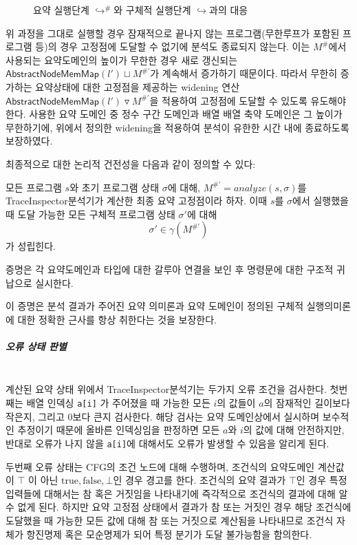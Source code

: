 \documentclass[a4paper,12pt]{article}
\newcommand{\imp}{\textsf{Imp}}
\newcommand{\traceinspector}{\textsf{TraceInspector}}
\begin{document}
\begin{figure}[t]
    \centering
    
    \caption{요약 실행단계 $\hookrightarrow^{\#}$와 구체적 실행단계 $\hookrightarrow$과의 대응}
    \label{fig:abs_conc_commute}
\end{figure}

위 과정을 그대로 실행할 경우 잠재적으로 끝나지 않는 프로그램(무한루프가 포함된 프로그램 등)의 경우 고정점에 도달할 수 없기에 분석도 종료되지 않는다. 
이는 $M^{\#}$에서 사용되는 요약도메인의 높이가 무한한 경우 새로 갱신되는 $\mathsf{AbstractNodeMemMap}(l') \sqcup M^{\#'}$가 계속해서 증가하기 때문이다. 따라서 무한히 증가하는 요약상태에 대한 고정점을 제공하는
widening 연산 $\mathsf{AbstractNodeMemMap}(l') \triangledown M^{\#'}$을 적용하여 고정점에 도달할 수 있도록 유도해야 한다. 
 사용한 요약 도메인 중 정수 구간 도메인과 배열 배열 축약 도메인은 그 높이가 무한하기에, 위에서 정의한 widening을 적용하여 분석이 유한한 시간 내에 종료하도록 보장하였다.

최종적으로  대한 논리적 건전성을 다음과 같이 정의할 수 있다:

\begin{utheorem}[\traceinspector 분석기의 논리적 건전성]
	 모든 프로그램 $s$와 초기 프로그램 상태 $\sigma$에 대해, $M^{\#'} = analyze(s, \sigma)$를 \traceinspector 분석기가 계산한 최종 요약 고정점이라 하자.
    이때 $s$를 $\sigma$에서 실행했을 때 도달 가능한 모든 구체적 프로그램 상태 $\sigma'$에 대해
    $$
    \sigma' \in \gamma(M^{\#'})
    $$
    가 성립힌다.
\end{utheorem}
증명은 각 요약도메인과 타입에 대한 갈루아 연결을 보인 후  명령문에 대한 구조적 귀납으로 실시한다. 

이 증명은  분석 결과가 주어진 요약 의미론과 요약 도메인이 정의된 구체적 실행의미론에 대한 정확한 근사를 항상 취한다는 것을 보장한다.

\subparagraph{오류 상태 판별} ~\\

계산된 요약 상태 위에서 \traceinspector 분석기는 두가지 오류 조건을 검사한다. 
첫번째는 배열 인덱싱 \verb|a[i]| 가 주어졌을 때 가능한 모든 $i$의 값들이 $a$의 잠재적인 길이보다 작은지, 그리고 0보다 큰지 검사한다.
해당 검사는 요약 도메인상에서 실시하며 보수적인 추정이기 때문에 올바른 인덱싱임을 판정하면 모든 $a$와 $i$의 값에 대해 안전하지만, 반대로 오류가 나지 않을 \verb|a[i]|에 
대해서도 오류가 발생할 수 있음을 알리게 된다.

두번째 오류 상태는 CFG의 조건 노드에 대해 수행하며, 조건식의 요약도메인 계산값이 $\top$ 이 아닌 $\mathrm{true, false}, \bot$인 경우 경고를 한다.
조건식의 요약 결과가 $\top$인 경우 특정 입력들에 대해서는 참 혹은 거짓임을 나타내기에 즉각적으로 조건식의 결과에 대해 알 수 없게 된다. 하지만 요약 고정점 상태에서 
결과가 참 또는 거짓인 경우 해당 조건식에 도달했을 때 가능한 모든 값에 대해 참 또는 거짓으로 계산됨을 나타내므로 조건식 자체가 항진명제 혹은 모순명제가 되어 특정 분기가 도달 불가능함을 함의한다.
\end{document}
